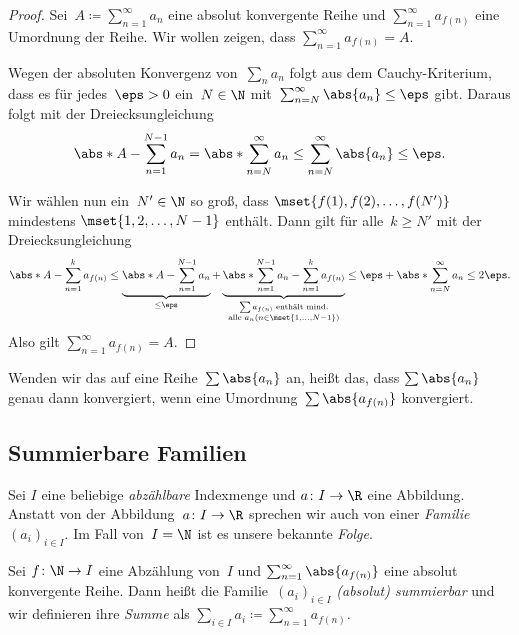 \documentclass[a4paper]{article}
\begin{document}
\begin{proof}
    Sei~$A \coloneqq \sum_{n=1}^\infty a_n$ eine absolut konvergente Reihe und $\sum_{n=1}^\infty a_{f(n)}$ eine Umordnung der Reihe. Wir wollen zeigen, dass $\sum_{n=1}^\infty a_{f(n)} = A$.

    Wegen der absoluten Konvergenz von~$\sum_n a_n$ folgt aus dem Cauchy-Kriterium, dass es für jedes~$\eps > 0$ ein~$N \in \N$ mit~$\sum_{n=N}^\infty \abs{a_n} \leq \eps$ gibt. Daraus folgt mit der Dreiecksungleichung
    \begin{equation*}
        \abs*{A - \sum_{n=1}^{N-1} a_n} = \abs*{\sum_{n=N}^\infty a_n} \leq \sum_{n=N}^\infty \abs{a_n} \leq \eps.
    \end{equation*}

    Wir wählen nun ein~$N' \in \N$ so groß, dass $\mset{f(1),f(2),\dots,f(N')}$ mindestens $\mset{1, 2,\dots,N-1}$ enthält. Dann gilt für alle~$k \geq N'$ mit der Dreiecksungleichung
    \begin{equation*}
        \abs*{A - \sum_{n=1}^k a_{f(n)}} \leq \underbrace{\abs*{A - \sum_{n=1}^{N-1} a_n}}_{\leq\eps} + \underbrace{\abs*{\sum_{n=1}^{N-1} a_n - \sum_{n=1}^k a_{f(n)}}}_{\substack{\sum a_{f(n)} \text{ enthält mind.}\\\text{alle } a_n (n\in\mset{1,\dots,N-1})}} \leq \eps + \abs*{\sum_{n=N}^\infty a_n} \leq 2\eps.
    \end{equation*}
    Also gilt $\sum_{n=1}^\infty a_{f(n)} = A$.
\end{proof}

Wenden wir das auf eine Reihe~$\sum \abs{a_n}$ an, heißt das, dass $\sum \abs{a_n}$ genau dann konvergiert, wenn eine Umordnung~$\sum \abs{a_{f(n)}}$ konvergiert.

\subsection{Summierbare Familien}

\begin{definition}[Familie]
    Sei $I$ eine beliebige \emph{abzählbare} Indexmenge und $a\colon I\to\R$ eine Abbildung. Anstatt von der Abbildung~$a\colon I\to\R$ sprechen wir auch von einer \emph{Familie}~$(a_i)_{i\in I}$. Im Fall von~$I = \N$ ist es unsere bekannte \emph{Folge}.
\end{definition}

\begin{definition}
    Sei $f\colon \N\to I$ eine Abzählung von~$I$ und $\sum_{n=1}^\infty \abs{a_{f(n)}}$ eine absolut konvergente Reihe. Dann heißt die Familie~$(a_i)_{i\in I}$ \emph{(absolut) summierbar} und wir definieren ihre \emph{Summe} als $\sum_{i\in I} a_i \coloneqq \sum_{n=1}^\infty a_{f(n)}$.
\end{definition}
\end{document}
